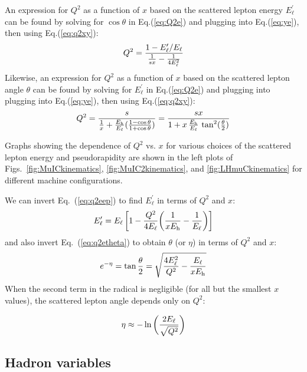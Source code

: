 \documentclass[12pt]{article}
\begin{document}
An expression for $Q^2$ as a function of $x$ based on the scattered
lepton energy $E^\prime_\ell$ can be found by solving for $\cos\theta$
in Eq.(\ref{eq:Q2e}) and plugging into Eq.(\ref{eq:ye}), then using
Eq.(\ref{eq:q2xy}):
%
\begin{equation}
Q^2 = {1- E^\prime_\ell/E_\ell \over {1\over s x} - {1 \over 4E_\ell^2} } 
\label{eq:q2eep}
\end{equation}
%
Likewise, an expression for $Q^2$ as a function of $x$ based on the
scattered lepton angle $\theta$ can be found by solving for $E^\prime_\ell$ in
Eq.(\ref{eq:Q2e}) and plugging into plugging into Eq.(\ref{eq:ye}), then using
Eq.(\ref{eq:q2xy}):
%
\begin{equation}
Q^2 = {s \over {1\over x} + {E_{\rm h} \over E_\ell}({1-\cos\theta
    \over 1+\cos\theta}) } =
{sx \over {1} + x\,{E_{\rm h} \over E_\ell}\,\tan^2({\theta \over 2})} 
\label{eq:q2etheta}
\end{equation}

Graphs showing the dependence of $Q^2$ vs. $x$ for various choices of the scattered lepton energy and pseudorapidity are shown in the left plots of Figs.~\ref{fig:MuICkinematics}, \ref{fig:MuIC2kinematics}, and \ref{fig:LHmuCkinematics} for different machine configurations. 

We can invert Eq.~(\ref{eq:q2eep}) to find $E^\prime_\ell$ in terms of $Q^2$ and $x$:
%
\begin{equation}
E^\prime_\ell  = E_\ell\, \bigg[ 1 - {Q^2 \over 4 E_\ell}\bigg({1 \over x E_{\rm h}} - {1\over E_\ell} \bigg)\bigg]
\label{eq:ep}
\end{equation}
%
and also invert Eq.~(\ref{eq:q2etheta}) to obtain $\theta$ (or $\eta$) in terms of $Q^2$ and $x$:
%
\begin{equation}
e^{-\eta} = \tan {\theta \over 2}   = \sqrt{ {4 E_\ell^2 \over Q^2} - {E_\ell \over x E_{\rm h}}}
\label{eq:theta}
\end{equation}
%
When the second term in the radical is negligible (for all but the smallest $x$ values), the scattered lepton angle depends only on $Q^2$:

\begin{equation}
\eta \approx -\ln \bigg( {2 E_\ell \over \sqrt{Q^2}} \bigg)
\end{equation}
%



\subsection{Hadron variables}
\end{document}
